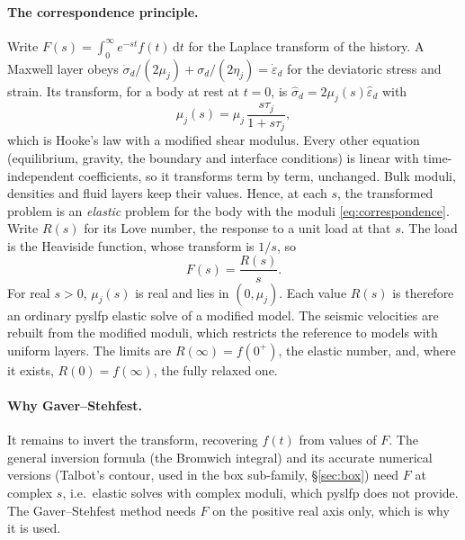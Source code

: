 \documentclass[11pt]{article}
\numberwithin{equation}{section}
\newcommand{\eps}{\varepsilon}
\begin{document}
\paragraph{The correspondence principle.}
Write $F(s)=\int_0^\infty e^{-st}f(t)\,\mathrm{d}t$ for the Laplace
transform of the history. A Maxwell layer obeys
$\dot\sigma_d/(2\mu_j)+\sigma_d/(2\eta_j)=\dot\eps_d$ for the deviatoric
stress and strain. Its transform, for a body at rest at $t=0$, is
$\hat\sigma_d=2\mu_j(s)\hat\eps_d$ with
\begin{equation}
  \mu_j(s) = \mu_j\,\frac{s\tau_j}{1+s\tau_j},
  \label{eq:correspondence}
\end{equation}
which is Hooke's law with a modified shear modulus. Every other equation
(equilibrium, gravity, the boundary and interface conditions) is linear
with time-independent coefficients, so it transforms term by term,
unchanged. Bulk moduli, densities and fluid layers keep their values.
Hence, at each $s$, the transformed problem is an \emph{elastic} problem
for the body with the moduli \eqref{eq:correspondence}. Write $R(s)$ for
its Love number, the response to a unit load at that $s$. The load is the
Heaviside function, whose transform is $1/s$, so
\begin{equation}
  F(s) = \frac{R(s)}{s} .
  \label{eq:FR}
\end{equation}
For real $s>0$, $\mu_j(s)$ is real and lies in $(0,\mu_j)$. Each value
$R(s)$ is therefore an ordinary pyslfp elastic solve of a modified model.
The seismic velocities are rebuilt from the modified moduli, which
restricts the reference to models with uniform layers. The limits are
$R(\infty)=f(0^+)$, the elastic number, and, where it exists,
$R(0)=f(\infty)$, the fully relaxed one.

\paragraph{Why Gaver--Stehfest.}
It remains to invert the transform, recovering $f(t)$ from values of
$F$. The general inversion formula (the Bromwich integral) and its
accurate numerical versions (Talbot's contour, used in the box
sub-family, \S\ref{sec:box}) need $F$ at complex $s$, i.e.\ elastic
solves with complex moduli, which pyslfp does not provide. The
Gaver--Stehfest method \cite{Gaver1966,Stehfest1970} needs $F$ on the
positive real axis only, which is why it is used.
\end{document}
